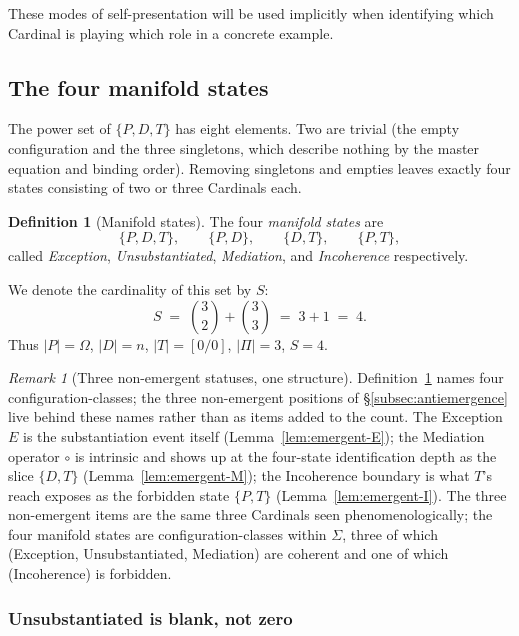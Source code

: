 \documentclass[11pt,a4paper]{article}
\theoremstyle{definition}
\newtheorem{definition}[theorem]{Definition}
\theoremstyle{remark}
\newtheorem{remark}[theorem]{Remark}
\begin{document}
These modes of self-presentation will be used implicitly when identifying which Cardinal is playing which role in a concrete example.

\subsection{The four manifold states}\label{subsec:states}

The power set of $\{P,D,T\}$ has eight elements. Two are trivial (the empty configuration and the three singletons, which describe nothing by the master equation and binding order). Removing singletons and empties leaves exactly four states consisting of two or three Cardinals each.

\begin{definition}[Manifold states]\label{def:states}
The four \emph{manifold states} are
\[
\{P,D,T\},\qquad \{P,D\},\qquad \{D,T\},\qquad \{P,T\},
\]
called \emph{Exception}, \emph{Unsubstantiated}, \emph{Mediation}, and \emph{Incoherence} respectively.
\end{definition}

We denote the cardinality of this set by $S$:
\begin{equation}
S \;=\; \binom{3}{2}+\binom{3}{3} \;=\; 3+1 \;=\; 4.
\label{eq:S}
\end{equation}
Thus $|P|=\Omega$, $|D|=n$, $|T|=[0/0]$, $|\Pi|=3$, $S=4$.

\begin{remark}[Three non-emergent statuses, one structure]\label{rem:states-nonemergent}
Definition~\ref{def:states} names four configuration-classes; the three non-emergent positions of \S\ref{subsec:antiemergence} live behind these names rather than as items added to the count. The Exception $E$ is the substantiation event itself (Lemma~\ref{lem:emergent-E}); the Mediation operator $\circ$ is intrinsic and shows up at the four-state identification depth as the slice $\{D,T\}$ (Lemma~\ref{lem:emergent-M}); the Incoherence boundary is what $T$'s reach exposes as the forbidden state $\{P,T\}$ (Lemma~\ref{lem:emergent-I}). The three non-emergent items are the same three Cardinals seen phenomenologically; the four manifold states are configuration-classes within $\Sigma$, three of which (Exception, Unsubstantiated, Mediation) are coherent and one of which (Incoherence) is forbidden.
\end{remark}

\subsubsection{Unsubstantiated is blank, not zero}\label{subsubsec:blank-not-zero}
\end{document}
